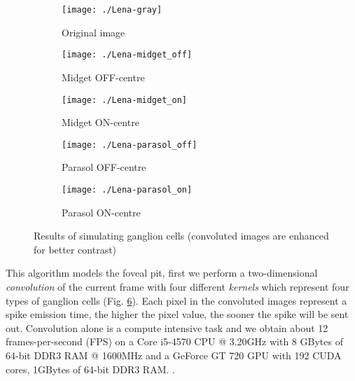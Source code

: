\begin{figure}[hbt]
  \centering
  \begin{subfigure}[t]{0.15\textwidth}
    \centering
    \captionsetup{justification=centering,margin=0.1cm}
    \texttt{[image: ./Lena-gray]}
    \caption{Original image}
    \label{pic-lena}
  \end{subfigure}
  \begin{subfigure}[t]{0.15\textwidth}
    \centering
    \captionsetup{justification=centering,margin=0.1cm}
    \texttt{[image: ./Lena-midget\_off]}
    \caption{Midget OFF-centre}
    \label{pic-lena-M-OFF}
  \end{subfigure}
  \begin{subfigure}[t]{0.15\textwidth}
    \centering
    \captionsetup{justification=centering,margin=0.1cm}
    \texttt{[image: ./Lena-midget\_on]}
    \caption{Midget ON-centre}
    \label{pic-lena-M-ON}
  \end{subfigure}
  \begin{subfigure}[t]{0.15\textwidth}
    \centering
    \captionsetup{justification=centering,margin=0.1cm}
    \texttt{[image: ./Lena-parasol\_off]}
    \caption{Parasol OFF-centre}
    \label{pic-lena-P-OFF}
  \end{subfigure}
  \begin{subfigure}[t]{0.15\textwidth}
    \centering
    \captionsetup{justification=centering,margin=0.1cm}
    \texttt{[image: ./Lena-parasol\_on]}
    \caption{Parasol ON-centre}
    \label{pic-lena-P-ON}
  \end{subfigure}
  \caption{Results of simulating ganglion cells (convoluted images are enhanced for better contrast)}
  \label{fig-convolution-results}
\end{figure}
This algorithm models the foveal pit, first we perform a two-dimensional  
\emph{convolution} of the current frame with four different \emph{kernels}
which represent four types of ganglion cells (Fig. 
\ref{fig-convolution-results}). Each pixel in the convoluted images represent a 
spike emission time, the higher the pixel value, the sooner the spike will be 
sent out. Convolution alone is a compute intensive task and we obtain about 12
frames-per-second (FPS) on a Core i5-4570 CPU @ 3.20GHz with 8 GBytes of 64-bit 
DDR3 RAM @ 1600MHz and a GeForce GT 720 GPU with 192 CUDA cores, 1GBytes of 64-bit DDR3 RAM.
.
